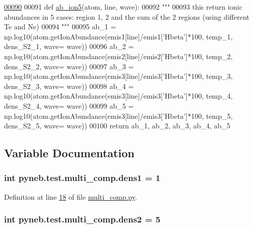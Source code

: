 \begin{DoxyCode}
\hypertarget{namespacepyneb_1_1test_1_1multi__comp_l00090}{}\hyperlink{namespacepyneb_1_1test_1_1multi__comp_a7030e84e6d88e5cf9f9fcdc4c9cb2a91}{00090} 
00091 \textcolor{keyword}{def }\hyperlink{namespacepyneb_1_1test_1_1multi__comp_a7030e84e6d88e5cf9f9fcdc4c9cb2a91}{ab\_ion5}(atom, line, wave):
00092     \textcolor{stringliteral}{"""}
00093 \textcolor{stringliteral}{    this return ionic abundances in 5 cases: region 1, 2 and the sum of the 2 regions (using different Te
       and Ne)}
00094 \textcolor{stringliteral}{    """}
00095     ab\_1 = np.log10(atom.getIonAbundance(emis1[line]/emis1[\textcolor{stringliteral}{'Hbeta'}]*100, temp\_1, dens\_S2\_1, wave= wave))
00096     ab\_2 = np.log10(atom.getIonAbundance(emis2[line]/emis2[\textcolor{stringliteral}{'Hbeta'}]*100, temp\_2, dens\_S2\_2, wave= wave))
00097     ab\_3 = np.log10(atom.getIonAbundance(emis3[line]/emis3[\textcolor{stringliteral}{'Hbeta'}]*100, temp\_3, dens\_S2\_3, wave= wave))
00098     ab\_4 = np.log10(atom.getIonAbundance(emis3[line]/emis3[\textcolor{stringliteral}{'Hbeta'}]*100, temp\_4, dens\_S2\_4, wave= wave))
00099     ab\_5 = np.log10(atom.getIonAbundance(emis3[line]/emis3[\textcolor{stringliteral}{'Hbeta'}]*100, temp\_5, dens\_S2\_5, wave= wave))
00100     \textcolor{keywordflow}{return} ab\_1, ab\_2, ab\_3, ab\_4, ab\_5

\end{DoxyCode}


\subsection{Variable Documentation}
\hypertarget{namespacepyneb_1_1test_1_1multi__comp_a2078ba8e90b451762c3c912b5644b070}{
\subsubsection[{dens1}]{\setlength{\rightskip}{0pt plus 5cm}int pyneb.\-test.\-multi\-\_\-comp.\-dens1 = 1}}\label{namespacepyneb_1_1test_1_1multi__comp_a2078ba8e90b451762c3c912b5644b070}


Definition at line \hyperlink{multi__comp_8py_source_l00018}{18} of file \hyperlink{multi__comp_8py_source}{multi\-\_\-comp.\-py}.

\hypertarget{namespacepyneb_1_1test_1_1multi__comp_a29f2b08d213d1af5d448ea758345f0a1}{
\subsubsection[{dens2}]{\setlength{\rightskip}{0pt plus 5cm}int pyneb.\-test.\-multi\-\_\-comp.\-dens2 = 5}}\label{namespacepyneb_1_1test_1_1multi__comp_a29f2b08d213d1af5d448ea758345f0a1}


